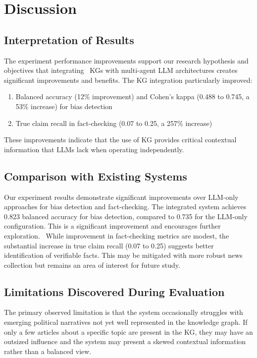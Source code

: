 \documentclass[11pt]{article}
\begin{document}
\section{Discussion}
\subsection{Interpretation of Results}
The experiment performance improvements support our research hypothesis and objectives that integrating  KGs with multi-agent LLM architectures creates significant improvements and benefits. The KG integration particularly improved:
\begin{enumerate}
    \item Balanced accuracy (12\% improvement) and Cohen’s kappa (0.488 to 0.745, a 53\% increase) for bias detection
    \item True claim recall in fact-checking (0.07 to 0.25, a 257\% increase)
\end{enumerate}

These improvements indicate that the use of KG provides critical contextual information that LLMs lack when operating independently.

\subsection{Comparison with Existing Systems}

Our experiment results demonstrate significant improvements over LLM-only approaches for bias detection and fact-checking. The integrated system achieves 0.823 balanced accuracy for bias detection, compared to 0.735 for the LLM-only configuration. This is a significant improvement and encourages further exploration. 
While improvement in fact-checking metrics are modest, the substantial increase in true claim recall (0.07 to 0.25) suggests better identification of verifiable facts. This may be mitigated with more robust news collection but remains an area of interest for future study.

\subsection{Limitations Discovered During Evaluation}
The primary observed limitation is that the system occasionally struggles with emerging political narratives not yet well represented in the knowledge graph. If only a few articles about a specific topic are present in the KG, they may have an outsized influence and the system may present a skewed contextual information rather than a balanced view. 
\end{document}
